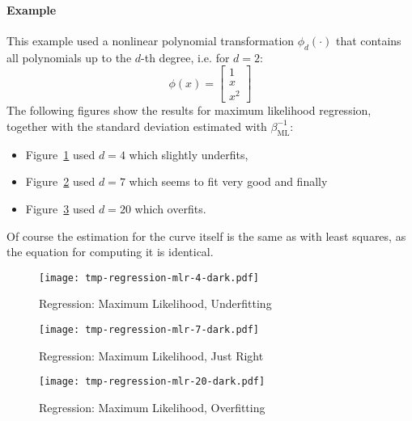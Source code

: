 			\paragraph{Example}
				This example used a nonlinear polynomial transformation \( \phi_d(\cdot) \) that contains all polynomials up to the \(d\)-th degree, i.e. for \( d = 2 \):
				\begin{equation}
					\phi(x) =
						\begin{bmatrix}
							1 \\
							x \\
							x^2
						\end{bmatrix}
				\end{equation}
				The following figures show the results for maximum likelihood regression, together with the standard deviation estimated with \( \beta_\textrm{ML}^{-1} \):
				\begin{itemize}
					\item Figure~\ref{fig:regressionMlUnderfit} used \( d = 4 \) which slightly underfits,
					\item Figure~\ref{fig:regressionMlRight} used \( d = 7 \) which seems to fit very good and finally
					\item Figure~\ref{fig:regressionMlOverfit} used \( d = 20 \) which overfits.
				\end{itemize}
				Of course the estimation for the curve itself is the same as with least squares, as the equation for computing it is identical.
				
				\begin{figure}
					\centering
					\texttt{[image: tmp-regression-mlr-4-dark.pdf]}
					\caption{Regression: Maximum Likelihood, Underfitting}
					\label{fig:regressionMlUnderfit}
				\end{figure}
				\begin{figure}
					\centering
					\texttt{[image: tmp-regression-mlr-7-dark.pdf]}
					\caption{Regression: Maximum Likelihood, Just Right}
					\label{fig:regressionMlRight}
				\end{figure}
				\begin{figure}
					\centering
					\texttt{[image: tmp-regression-mlr-20-dark.pdf]}
					\caption{Regression: Maximum Likelihood, Overfitting}
					\label{fig:regressionMlOverfit}
				\end{figure}


